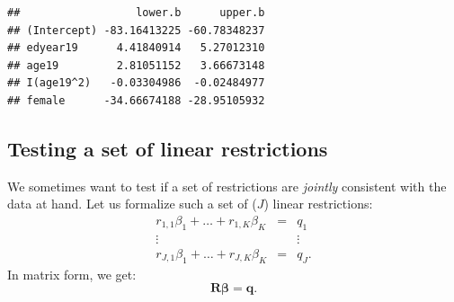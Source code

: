 \documentclass[
  12pt,
]{book}
\newenvironment{Shaded}{\begin{snugshade}}{\end{snugshade}}
\newcommand{\AttributeTok}[1]{\textcolor[rgb]{0.13,0.29,0.53}{#1}}
\newcommand{\DecValTok}[1]{\textcolor[rgb]{0.00,0.00,0.81}{#1}}
\newcommand{\FunctionTok}[1]{\textcolor[rgb]{0.13,0.29,0.53}{\textbf{#1}}}
\newcommand{\NormalTok}[1]{#1}
\newcommand{\OtherTok}[1]{\textcolor[rgb]{0.56,0.35,0.01}{#1}}
\newcommand{\SpecialCharTok}[1]{\textcolor[rgb]{0.81,0.36,0.00}{\textbf{#1}}}
\theoremstyle{definition}
\theoremstyle{definition}
\theoremstyle{definition}
\theoremstyle{definition}
\theoremstyle{remark}
\begin{document}
\begin{Shaded}
\end{Shaded}

\begin{verbatim}
##                  lower.b      upper.b
## (Intercept) -83.16413225 -60.78348237
## edyear19      4.41840914   5.27012310
## age19         2.81051152   3.66673148
## I(age19^2)   -0.03304986  -0.02484977
## female      -34.66674188 -28.95105932
\end{verbatim}

\hypertarget{Ftest}{%
\subsection{Testing a set of linear restrictions}\label{Ftest}}

We sometimes want to test if a set of restrictions are \emph{jointly} consistent with the data at hand. Let us formalize such a set of (\(J\)) linear restrictions:
\begin{equation}\label{eq:restrictions}
\begin{array}{ccc}
r_{1,1} \beta_1 + \dots + r_{1,K} \beta_K &=& q_1\\
\vdots && \vdots\\
r_{J,1} \beta_1 + \dots + r_{J,K} \beta_K &=& q_J.
\end{array}
\end{equation}
In matrix form, we get:
\begin{equation}
\mathbf{R}\boldsymbol\beta = \mathbf{q}.
\end{equation}
\end{document}
